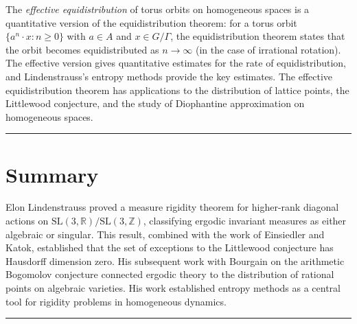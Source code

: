 The \emph{effective equidistribution} of torus orbits on homogeneous spaces is a quantitative version of the equidistribution theorem: for a torus orbit $\{a^n \cdot x : n \ge 0\}$ with $a \in A$ and $x \in G/\Gamma$, the equidistribution theorem states that the orbit becomes equidistributed as $n \to \infty$ (in the case of irrational rotation). The effective version gives quantitative estimates for the rate of equidistribution, and Lindenstrauss's entropy methods provide the key estimates. The effective equidistribution theorem has applications to the distribution of lattice points, the Littlewood conjecture, and the study of Diophantine approximation on homogeneous spaces.

\begin{center}\rule{0.5\linewidth}{0.5pt}\end{center}

\section*{Summary}

Elon Lindenstrauss \cite{lindenstrauss2008} proved a measure rigidity theorem for higher-rank diagonal actions on $\text{SL}(3,\mathbb{R})/\text{SL}(3,\mathbb{Z})$, classifying ergodic invariant measures as either algebraic or singular. This result, combined with the work of Einsiedler and Katok, established that the set of exceptions to the Littlewood conjecture has Hausdorff dimension zero. His subsequent work with Bourgain on the arithmetic Bogomolov conjecture connected ergodic theory to the distribution of rational points on algebraic varieties. His work established entropy methods as a central tool for rigidity problems in homogeneous dynamics.

\begin{center}\rule{0.5\linewidth}{0.5pt}\end{center}
